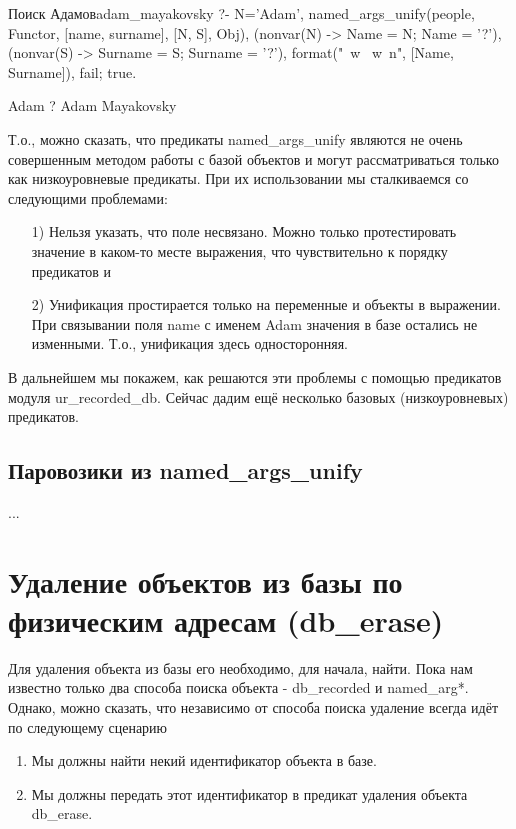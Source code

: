 \documentclass[a4paper]{book}
\def\na{named_args_unify}
\begin{document}
\begin{example}{Поиск Адамов}{adam_mayakovsky}
?- N='Adam', 
   named_args_unify(people, Functor, [name, surname], 
                    [N, S], Obj), 
   (nonvar(N) -> Name = N; Name = '?'), 
   (nonvar(S) -> Surname = S; Surname = '?'), 
   format("~w ~w~n", [Name, Surname]), fail; true.
                                                              
Adam ?
Adam Mayakovsky
\end{example}

Т.о., можно сказать, что предикаты \na{} являются
не очень совершенным методом работы с базой объектов и могут
рассматриваться только как низкоуровневые предикаты. При их
использовании мы сталкиваемся со следующими проблемами:

\begin{itemize}
\item[1)] Нельзя указать, что поле несвязано. Можно только
  протестировать значение в каком-то месте выражения, что
  чувствительно к порядку предикатов и
\item[2)] Унификация простирается только на переменные и объекты в
  выражении. При связывании поля name с именем Adam значения в
  базе остались не изменными. Т.о., унификация здесь
  односторонняя.
\end{itemize}

В дальнейшем мы покажем, как решаются эти проблемы с помощью
предикатов модуля ur_recorded_db. Сейчас дадим ещё несколько
базовых (низкоуровневых) предикатов.

\subsection{Паровозики из \na}

...

\section{Удаление объектов из базы по физическим адресам
  (db_erase)}
\label{db_erase}
\label{db_copy}


Для удаления объекта из базы его необходимо, для начала,
найти. Пока нам известно только два способа поиска объекта -
db_recorded и named_arg*. Однако, можно сказать, что независимо
от способа поиска удаление всегда идёт по следующему сценарию

\begin{enumerate}
\item Мы должны найти некий идентификатор объекта в базе.
\item Мы должны передать этот идентификатор в предикат удаления
  объекта db_erase.
\end{enumerate}
\end{document}
